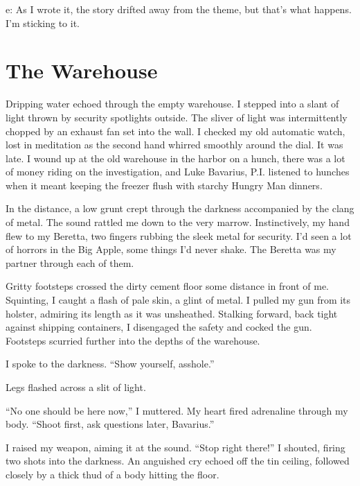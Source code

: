 e: As I wrote it, the story drifted away from the theme, but that's
what happens. I'm sticking to it. 
 





\chapter{The Warehouse}



Dripping water echoed through the empty warehouse. I stepped into a
slant of light thrown by security spotlights outside. The sliver of
light was intermittently chopped by an exhaust fan set into the
wall. I checked my old automatic watch, lost in meditation as the
second hand whirred smoothly around the dial. It was late. I wound
up at the old warehouse in the harbor on a hunch, there was a lot
of money riding on the investigation, and Luke Bavarius, P.I.
listened to hunches when it meant keeping the freezer flush with
starchy Hungry Man dinners.



In the distance, a low grunt crept through the darkness accompanied
by the clang of metal. The sound rattled me down to the very
marrow. Instinctively, my hand flew to my Beretta, two fingers
rubbing the sleek metal for security. I'd seen a lot of horrors in
the Big Apple, some things I'd never shake. The Beretta was my
partner through each of them.



Gritty footsteps crossed the dirty cement floor some distance in
front of me. Squinting, I caught a flash of pale skin, a glint of
metal. I pulled my gun from its holster, admiring its length as it
was unsheathed. Stalking forward, back tight against shipping
containers, I disengaged the safety and cocked the gun. Footsteps
scurried further into the depths of the warehouse.



I spoke to the darkness. ``Show yourself,
asshole.''



Legs flashed across a slit of light.



``No one should be here now,'' I muttered. My heart fired
adrenaline through my body. ``Shoot first, ask questions
later, Bavarius.''



I raised my weapon, aiming it at the sound. ``Stop right
there!'' I shouted, firing two shots into the darkness. An
anguished cry echoed off the tin ceiling, followed closely by a
thick thud of a body hitting the floor.



